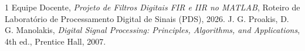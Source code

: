 \documentclass[10pt, conference]{IEEEtran}
\begin{document}
\begin{thebibliography}{1}
Equipe Docente, \emph{Projeto de Filtros Digitais FIR e IIR no MATLAB}, Roteiro de Laboratório de Processamento Digital de Sinais (PDS), 2026.
J. G. Proakis, D. G. Manolakis, \emph{Digital Signal Processing: Principles, Algorithms, and Applications}, 4th ed., Prentice Hall, 2007.
\end{thebibliography}
\end{document}

